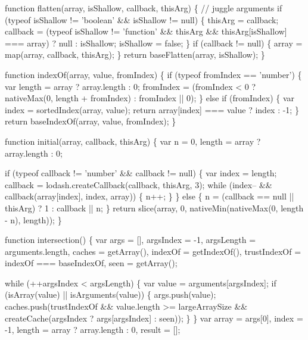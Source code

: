 \begin{DoxyCodeInclude}
    \textcolor{keyword}{function} flatten(array, isShallow, callback, thisArg) \{
      \textcolor{comment}{// juggle arguments}
      \textcolor{keywordflow}{if} (typeof isShallow != \textcolor{stringliteral}{'boolean'} && isShallow != null) \{
        thisArg = callback;
        callback = (typeof isShallow != \textcolor{stringliteral}{'function'} && thisArg && thisArg[isShallow] === array) ? null : 
      isShallow;
        isShallow = \textcolor{keyword}{false};
      \}
      \textcolor{keywordflow}{if} (callback != null) \{
        array = map(array, callback, thisArg);
      \}
      \textcolor{keywordflow}{return} baseFlatten(array, isShallow);
    \}

    \textcolor{keyword}{function} indexOf(array, value, fromIndex) \{
      \textcolor{keywordflow}{if} (typeof fromIndex == \textcolor{stringliteral}{'number'}) \{
        var length = array ? array.length : 0;
        fromIndex = (fromIndex < 0 ? nativeMax(0, length + fromIndex) : fromIndex || 0);
      \} \textcolor{keywordflow}{else} \textcolor{keywordflow}{if} (fromIndex) \{
        var index = sortedIndex(array, value);
        \textcolor{keywordflow}{return} array[index] === value ? index : -1;
      \}
      \textcolor{keywordflow}{return} baseIndexOf(array, value, fromIndex);
    \}

    \textcolor{keyword}{function} initial(array, callback, thisArg) \{
      var n = 0,
          length = array ? array.length : 0;

      \textcolor{keywordflow}{if} (typeof callback != \textcolor{stringliteral}{'number'} && callback != null) \{
        var index = length;
        callback = lodash.createCallback(callback, thisArg, 3);
        \textcolor{keywordflow}{while} (index-- && callback(array[index], index, array)) \{
          n++;
        \}
      \} \textcolor{keywordflow}{else} \{
        n = (callback == null || thisArg) ? 1 : callback || n;
      \}
      \textcolor{keywordflow}{return} slice(array, 0, nativeMin(nativeMax(0, length - n), length));
    \}

    \textcolor{keyword}{function} intersection() \{
      var args = [],
          argsIndex = -1,
          argsLength = arguments.length,
          caches = getArray(),
          indexOf = getIndexOf(),
          trustIndexOf = indexOf === baseIndexOf,
          seen = getArray();

      \textcolor{keywordflow}{while} (++argsIndex < argsLength) \{
        var value = arguments[argsIndex];
        \textcolor{keywordflow}{if} (isArray(value) || isArguments(value)) \{
          args.push(value);
          caches.push(trustIndexOf && value.length >= largeArraySize &&
            createCache(argsIndex ? args[argsIndex] : seen));
        \}
      \}
      var array = args[0],
          index = -1,
          length = array ? array.length : 0,
          result = [];


\end{DoxyCodeInclude}
